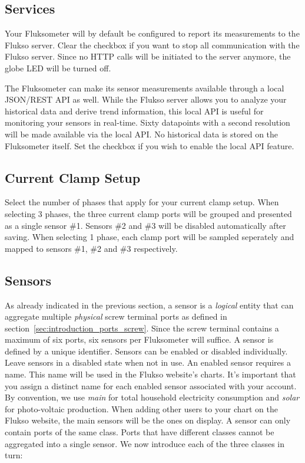 \subsection{Services}
Your Fluksometer will by default be configured to report its measurements to the Flukso server. Clear the checkbox if you want to stop all communication with the Flukso server. Since no HTTP calls will be initiated to the server anymore, the globe LED will be turned off.

The Fluksometer can make its sensor measurements available through a local JSON/REST API as well. While the Flukso server allows you to analyze your historical data and derive trend information, this local API is useful for monitoring your sensors in real-time. Sixty datapoints with a second resolution will be made available via the local API. No historical data is stored on the Fluksometer itself. Set the checkbox if you wish to enable the local API feature.

\subsection{Current Clamp Setup}
Select the number of phases that apply for your current clamp setup. When selecting 3 phases, the three current clamp ports will be grouped and presented as a single sensor \#1. Sensors \#2 and \#3 will be disabled automatically after saving. When selecting 1 phase, each clamp port will be sampled seperately and mapped to sensors \#1, \#2 and \#3 respectively.

\subsection{Sensors}
As already indicated in the previous section, a sensor is a \emph{logical} entity that can aggregate multiple \emph{physical} screw terminal ports as defined in section~\ref{sec:introduction_ports_screw}. Since the screw terminal contains a maximum of six ports, six sensors per Fluksometer will suffice. A sensor is defined by a unique identifier. Sensors can be enabled or disabled individually. Leave sensors in a disabled state when not in use. An enabled sensor requires a name. This name will be used in the Flukso website's charts. It's important that you assign a distinct name for each enabled sensor associated with your account. By convention, we use \emph{main} for total household electricity consumption and \emph{solar} for photo-voltaic production. When adding other users to your chart on the Flukso website, the main sensors will be the ones on display. A sensor can only contain ports of the same class. Ports that have different classes cannot be aggregated into a single sensor. We now introduce each of the three classes in turn:

